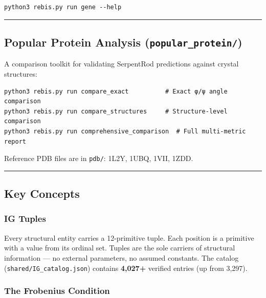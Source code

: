 \begin{verbatim}
python3 rebis.py run gene --help
\end{verbatim}

\begin{center}\rule{0.5\linewidth}{0.5pt}\end{center}

\hypertarget{popular-protein-analysis-popular_protein}{%
\subsection{\texorpdfstring{Popular Protein Analysis
(\texttt{popular\_protein/})}{Popular Protein Analysis (popular\_protein/)}}\label{popular-protein-analysis-popular_protein}}

A comparison toolkit for validating SerpentRod predictions against
crystal structures:

\begin{verbatim}
python3 rebis.py run compare_exact          # Exact φ/ψ angle comparison
python3 rebis.py run compare_structures     # Structure-level comparison
python3 rebis.py run comprehensive_comparison  # Full multi-metric report
\end{verbatim}

Reference PDB files are in \texttt{pdb/}: 1L2Y, 1UBQ, 1VII, 1ZDD.

\begin{center}\rule{0.5\linewidth}{0.5pt}\end{center}

\hypertarget{key-concepts}{%
\subsection{Key Concepts}\label{key-concepts}}

\hypertarget{ig-tuples}{%
\subsubsection{IG Tuples}\label{ig-tuples}}

Every structural entity carries a 12-primitive tuple. Each position is a
primitive with a value from its ordinal set. Tuples are the sole
carriers of structural information --- no external parameters, no
assumed constants. The catalog (\texttt{shared/IG\_catalog.json})
contains \textbf{4,027+} verified entries (up from 3,297).

\hypertarget{the-frobenius-condition}{%
\subsubsection{The Frobenius Condition}\label{the-frobenius-condition}}

